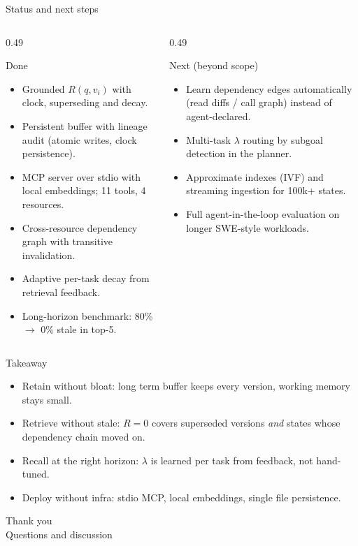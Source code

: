 \documentclass[aspectratio=169,10pt]{beamer}
\begin{document}
\begin{frame}{Status and next steps}
  \begin{columns}[T,onlytextwidth]
    \begin{column}{0.49\textwidth}
      \begin{block}{Done}
        \begin{itemize}
          \item Grounded $R(q,v_i)$ with clock, superseding and decay.
          \item Persistent buffer with lineage audit (atomic writes, clock persistence).
          \item MCP server over stdio with local embeddings; 11 tools, 4 resources.
          \item Cross-resource dependency graph with transitive invalidation.
          \item Adaptive per-task decay from retrieval feedback.
          \item Long-horizon benchmark: 80\% $\to$ 0\% stale in top-5.
        \end{itemize}
      \end{block}
    \end{column}
    \begin{column}{0.49\textwidth}
      \begin{block}{Next (beyond scope)}
        \begin{itemize}
          \item Learn dependency edges automatically (read diffs / call graph) instead of agent-declared.
          \item Multi-task $\lambda$ routing by subgoal detection in the planner.
          \item Approximate indexes (IVF) and streaming ingestion for 100k+ states.
          \item Full agent-in-the-loop evaluation on longer SWE-style workloads.
        \end{itemize}
      \end{block}
    \end{column}
  \end{columns}
\end{frame}

\begin{frame}{Takeaway}
  \begin{itemize}
    \item Retain without bloat: long term buffer keeps every version, working memory stays small.
    \item Retrieve without stale: $R=0$ covers superseded versions \emph{and} states whose dependency chain moved on.
    \item Recall at the right horizon: $\lambda$ is learned per task from feedback, not hand-tuned.
    \item Deploy without infra: stdio MCP, local embeddings, single file persistence.
  \end{itemize}
  \vspace{1.2em}
  \centering
  {\Large Thank you}\\[2pt]
  {\small Questions and discussion}
\end{frame}
\end{document}
